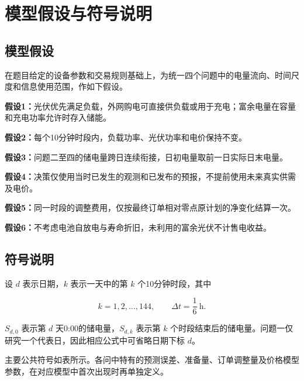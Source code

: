 \section{模型假设与符号说明}

\subsection{模型假设}

在题目给定的设备参数和交易规则基础上，为统一四个问题中的电量流向、时间尺度和信息使用范围，作如下假设。

\noindent\textbf{假设1：}光伏优先满足负载，外网购电可直接供负载或用于充电；富余电量在容量和充电功率允许时存入储能。

\noindent\textbf{假设2：}每个10分钟时段内，负载功率、光伏功率和电价保持不变。

\noindent\textbf{假设3：}问题二至四的储电量跨日连续衔接，日初电量取前一日实际日末电量。

\noindent\textbf{假设4：}决策仅使用当时已发生的观测和已发布的预报，不提前使用未来真实供需及电价。

\noindent\textbf{假设5：}同一时段的调整费用，仅按最终订单相对零点原计划的净变化结算一次。

\noindent\textbf{假设6：}不考虑电池自放电与寿命折旧，未利用的富余光伏不计售电收益。

\newpage
\subsection{符号说明}

设 $d$ 表示日期，$k$ 表示一天中的第 $k$ 个10分钟时段，其中

\begin{equation}
k=1,2,\ldots,144,
\qquad
\Delta t=\frac{1}{6}\ \mathrm{h}.
\end{equation}

$S_{d,0}$ 表示第 $d$ 天0:00的储电量，$S_{d,k}$ 表示第 $k$ 个时段结束后的储电量。问题一仅研究一个代表日，因此相应公式中可省略日期下标 $d$。

主要公共符号如表所示。各问中特有的预测误差、准备量、订单调整量及价格模型参数，在对应模型中首次出现时再单独定义。

